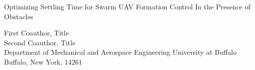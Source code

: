 \pagestyle{empty}

\setlength{\oddsidemargin}{1in}
\setlength{\evensidemargin}{1in}
\setlength{\marginparwidth}{0.0in}
\setlength{\topmargin}{0.5in}
\setlength{\headheight}{0in}
\setlength{\headsep}{0in}
\setlength{\textwidth}{4.5in}
\setlength{\textheight}{7.5in}
\setlength{\parindent}{0.25in}
\setlength{\parskip}{0.0in}

\setlength{\baselineskip}{10pt}



\begin{center}
{\footnotesize{\hvb
Optimizing Settling Time for Swarm UAV Formation Control In the Presence of Obstacles\\
}}

\vspace{10pt}
{\footnotesize
{\hvb First Coauthor}, {\hv Title} \\
{\hvb Second Coauthor}, {\hv Title} \\
{\hv
Department of Mechanical and Aerospace Engineering
University at Buffalo
Buffalo, New York, 14261
}}
\end{center}






